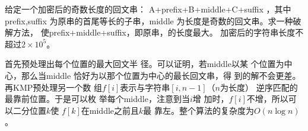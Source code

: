 \begin{prob}
	给定一个加密后的奇数长度的回文串：
	A+prefix+B+middle+C+suffix
	，其中prefix,suffix
	为原串的首尾等长的子串，middle
	为长度是奇数的回文串。求一种破解方法，
	使prefix+middle+suffix，即原串，的长度最大。
	加密后的字符串长度不超过$2 \times 10^5$。
\end{prob}

\begin{sol}
	首先预处理出每个位置的最大回文半
	径。可以证明，若middle以某
	个位置为中心，那么当middle
	恰好为以那个位置为中心的最长回文串，得
	到的解不会更差。再KMP预处理另一个数
	组$f[i]$表示与字符串$[i,n-1]$（$n$为长度）
	逆序匹配的最靠前位置。于是可以枚
	举每个middle，注意到当$i$增
	加时，$f[i]$不增，所以可以二分位置$k$使
	$f[k]$在middle之前且$k$最
	靠左。整个算法的复杂度为$O(n\log n)$。
\end{sol}
